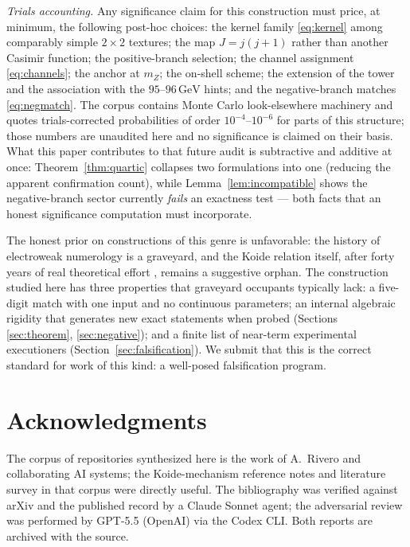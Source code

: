 \documentclass[11pt,a4paper]{article}
\theoremstyle{definition}
\newcommand{\GeV}{\,\mathrm{GeV}}
\begin{document}
\emph{Trials accounting.} Any significance claim for this construction must
price, at minimum, the following post-hoc choices: the kernel family
\eqref{eq:kernel} among comparably simple $2\times2$ textures; the map
$J=j(j+1)$ rather than another Casimir function; the positive-branch
selection; the channel assignment \eqref{eq:channels}; the anchor at $m_Z$;
the on-shell scheme; the extension of the tower and the association with
the $95$--$96\GeV$ hints; and the negative-branch matches
\eqref{eq:negmatch}. The corpus contains Monte Carlo look-elsewhere
machinery and quotes trials-corrected probabilities of order
$10^{-4}$--$10^{-6}$ for parts of this structure; those numbers are
unaudited here and no significance is claimed on their basis. What this
paper contributes to that future audit is subtractive and additive at once:
Theorem~\ref{thm:quartic} collapses two formulations into one (reducing the
apparent confirmation count), while Lemma~\ref{lem:incompatible} shows the
negative-branch sector currently \emph{fails} an exactness test --- both
facts that an honest significance computation must incorporate.

The honest prior on constructions of this genre is unfavorable: the history
of electroweak numerology is a graveyard, and the Koide relation itself,
after forty years of real theoretical effort
\cite{koide1990,sumino2009,riverogsponer2005}, remains a suggestive orphan.
The construction studied here has three properties that graveyard occupants
typically lack: a five-digit match with one input and no continuous
parameters; an internal algebraic rigidity that generates new exact
statements when probed (Sections \ref{sec:theorem}, \ref{sec:negative});
and a finite list of near-term experimental executioners
(Section~\ref{sec:falsification}). We submit that this is the correct
standard for work of this kind: a well-posed falsification program.

\section*{Acknowledgments}
The corpus of repositories synthesized here is the work of A.~Rivero and
collaborating AI systems; the Koide-mechanism reference notes and
literature survey in that corpus were directly useful. The bibliography was
verified against arXiv and the published record by a Claude Sonnet agent;
the adversarial review was performed by GPT-5.5 (OpenAI) via the Codex CLI.
Both reports are archived with the source.
\end{document}
